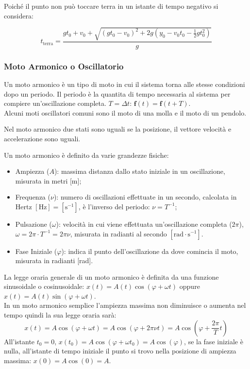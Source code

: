 \documentclass{article}
\newcommand{\vect}[1]{\boldsymbol{\mathbf{#1}}}
\numberwithin{equation}{subsection}
\begin{document}
Poiché il punto non può toccare terra in un istante di tempo 
negativo si considera:

\begin{equation}
    t_\mathrm{terra} = \displaystyle\frac{gt_0+v_0 +\sqrt{(gt_0-v_0)^{2}+2g\left(y_0-v_0t_0-\displaystyle\frac{1}{2}gt_0^{2}\right)}}{g}
\end{equation}

\subsubsection{Moto Armonico o Oscillatorio}

Un moto armonico è un tipo di moto in cui il sistema torna 
alle stesse condizioni dopo un periodo.
Il periodo è la quantita di tempo necessaria 
al sistema per compiere un'oscillazione completa.
$T = \Delta t$: $\vect{f}(t) = \vect{f}(t + T)$.
\\
Alcuni moti oscillatori comuni sono il moto di una molla e il 
moto di un pendolo.

Nel moto armonico due stati sono uguali se la posizione, 
il vettore velocità e accelerazione sono uguali.

Un moto armonico è definito da varie grandezze fisiche:

\begin{itemize}
    \item Ampiezza ($A$): massima distanza dallo stato iniziale 
    in un oscillazione, misurata in metri [m];
    \item Frequenza ($\nu$): numero di oscillazioni effettuate 
    in un secondo, calcolata in Hertz $[\mathrm{Hz}]=[\mathrm{s}^{-1}]$, è l'inverso del 
    periodo: $\nu =T^{-1}$;
    \item Pulsazione ($\omega$): velocità in cui viene 
    effettuata un'oscillazione completa ($2\pi$), $\omega = 2\pi\cdot T^{-1} = 2\pi\nu$, 
    misurata in radianti al secondo $\left[\mathrm{rad}\cdot\mathrm{s}^{-1}\right]$.
    \item Fase Iniziale ($\varphi$): indica il punto dell'oscillazione 
    da dove comincia il moto, misurata in radianti [rad].
\end{itemize}

La legge oraria generale di un moto armonico è definita da 
una funzione sinusoidale o cosinusoidale: $x(t) = A(t)\cos(\varphi+\omega t)$ oppure $ x(t) = A(t)\sin(\varphi+\omega t)$.\\ 
In un moto armonico semplice l'ampiezza massima non diminuisce o 
aumenta nel tempo quindi la sua legge oraria sarà:  
\begin{equation}
    x(t) = A\cos(\varphi + \omega t) =A\cos(\varphi + 2\pi\nu t) = A\cos\left(\varphi + \displaystyle\frac{2\pi}{T}t\right)
\end{equation}
All'istante $t_0 = 0$, $x(t_0) = A\cos(\varphi + \omega t_0) = 
A\cos(\varphi)$, se la fase iniziale è nulla, all'istante di 
tempo iniziale il punto si trovo nella posizione 
di ampiezza massima: $x(0) = A\cos(0) = A$. 
\end{document}
